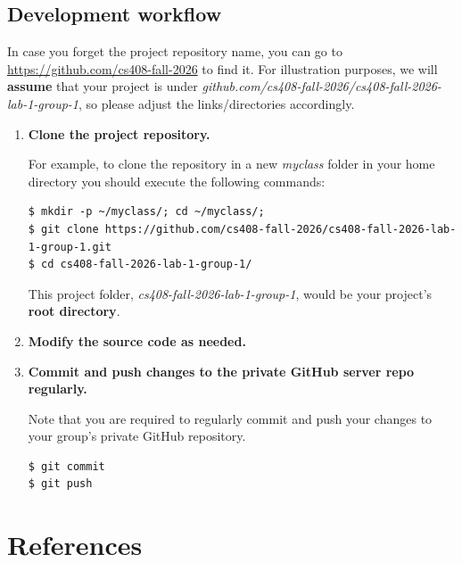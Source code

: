 \documentclass[letterpaper,11pt]{article}
\begin{document}
\subsection{Development workflow}
\label{development-workflow}

In case you forget the project repository name, you can go to
\url{https://github.com/cs408-fall-2026} to find it. For illustration
purposes, we will \textbf{assume} that your project is under
\emph{github.com/cs408-fall-2026/cs408-fall-2026-lab-1-group-1}, so please adjust the links/directories accordingly.

\begin{enumerate}

\item \textbf{Clone the project repository.}

For example, to clone the repository in a new \textit{myclass} folder in your home
directory you should execute the following commands:

\begin{verbatim}
$ mkdir -p ~/myclass/; cd ~/myclass/;
$ git clone https://github.com/cs408-fall-2026/cs408-fall-2026-lab-1-group-1.git
$ cd cs408-fall-2026-lab-1-group-1/
\end{verbatim}

This project folder, \emph{cs408-fall-2026-lab-1-group-1}, would be your
project's \textbf{root directory}.

\item \textbf{Modify the source code as needed.}



\item \textbf{Commit and push changes to the private GitHub server repo regularly.}

Note that you are required to regularly commit and push your changes to your group's private
GitHub repository.

\begin{verbatim}
$ git commit
$ git push
\end{verbatim}

\end{enumerate}

\section*{References}
\end{document}
